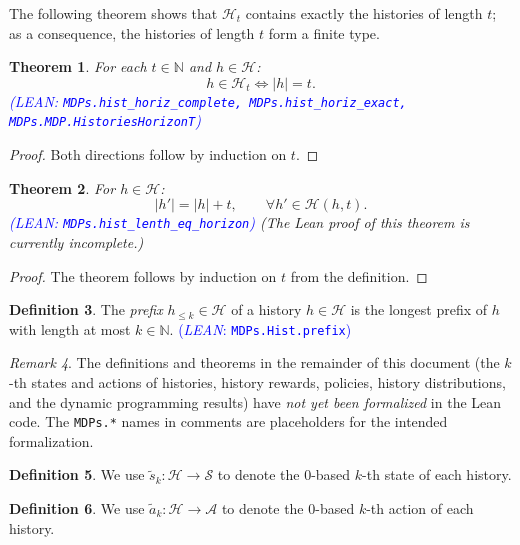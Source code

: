 \documentclass[letterpaper]{article}
\theoremstyle{plain}
\newtheorem{theorem}{Theorem}[subsection]
\theoremstyle{definition}
\newtheorem{definition}[theorem]{Definition}
\theoremstyle{remark}
\newtheorem{remark}[theorem]{Remark}
\newcommand{\Nats}{\mathbb{N}}
\newcommand{\lean}[1]{\textcolor{blue}{(\emph{LEAN}: \texttt{#1})}}
\newcommand{\leanok}{}
\newcommand{\notready}{}
\begin{document}
The following theorem shows that $\mathcal{H}_t$ contains exactly the histories of length $t$; as a consequence, the histories of length $t$ form a finite type.
\begin{theorem} \label{thm:hist-horizon-exact}
  For each $t\in \Nats$ and $h\in \mathcal{H}$:
  \[
    h \in \mathcal{H}_t \iff |h| = t.
  \]
  \lean{MDPs.hist\_horiz\_complete, MDPs.hist\_horiz\_exact, MDPs.MDP.HistoriesHorizonT} \leanok
\end{theorem}
\begin{proof}
Both directions follow by induction on $t$.
\end{proof}

\begin{theorem} \label{thm:hist-lenth-eq-horizon}
  For $h \in \mathcal{H}$:
  \[
   |h'| = |h| + t, \qquad \forall h'\in \mathcal{H}(h, t).
  \]
\lean{MDPs.hist\_lenth\_eq\_horizon} \notready
(The Lean proof of this theorem is currently incomplete.)
\end{theorem}
\begin{proof}
The theorem follows by induction on $t$ from the definition.
\end{proof}

\begin{definition} \label{def:hist-prefix}
The \emph{prefix} $h_{\le k} \in \mathcal{H}$ of a history $h \in \mathcal{H}$ is the longest prefix of $h$ with length at most $k\in \Nats$.
\lean{MDPs.Hist.prefix} \leanok
\end{definition}

\begin{remark}
The definitions and theorems in the remainder of this document (the $k$-th states and actions of histories, history rewards, policies, history distributions, and the dynamic programming results) have \emph{not yet been formalized} in the Lean code. The \texttt{MDPs.*} names in comments are placeholders for the intended formalization.
\end{remark}

\begin{definition}
  We use $\tilde{s}_k\colon \mathcal{H} \to \mathcal{S}$ to denote the 0-based $k$-th state of each history.
\end{definition}

\begin{definition}
  We use $\tilde{a}_k\colon \mathcal{H} \to \mathcal{A}$ to denote the 0-based $k$-th action of each history.
\end{definition}
\end{document}

